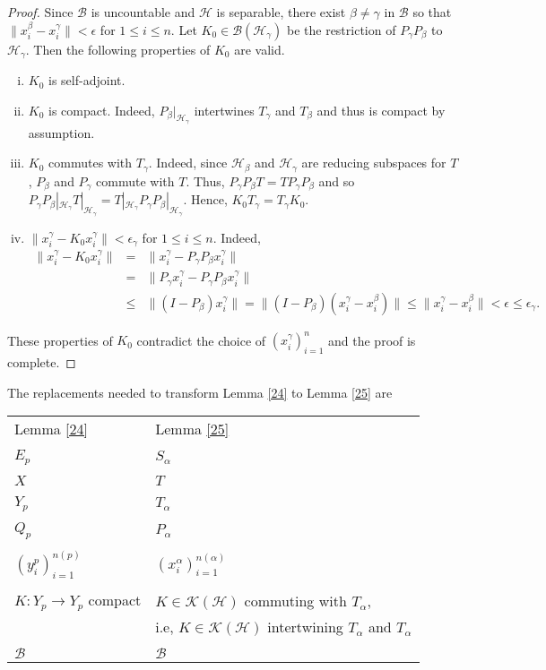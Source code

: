 \documentclass[11pt]{amsart}
\theoremstyle{definition}
\numberwithin{equation}{section}
\begin{document}
\begin{proof}
Since $\mathscr{B}$ is uncountable and $\mathcal{H}$ is separable, there exist $\beta\neq\gamma$ in $\mathscr{B}$ so that $\|x_{i}^{\beta}-x_{i}^{\gamma}\|<\epsilon$ for
$1\leq i\leq n$. Let $K_{0}\in\mathcal{B}(\mathcal{H}_{\gamma})$ be the restriction of $P_{\gamma}P_{\beta}$ to $\mathcal{H}_{\gamma}$. Then the following properties of
$K_{0}$ are valid.
\begin{enumerate}[(i)]
\item $K_{0}$ is self-adjoint.
\item $K_{0}$ is compact. Indeed, $P_{\beta}|_{\mathcal{H}_{\gamma}}$ intertwines $T_{\gamma}$ and $T_{\beta}$ and thus is compact by assumption.
\item $K_{0}$ commutes with $T_{\gamma}$. Indeed, since $\mathcal{H}_{\beta}$ and $\mathcal{H}_{\gamma}$ are reducing subspaces for $T$, $P_{\beta}$ and $P_{\gamma}$
commute with $T$. Thus, $P_{\gamma}P_{\beta}T=TP_{\gamma}P_{\beta}$ and so $P_{\gamma}P_{\beta}|_{\mathcal{H}_{\gamma}}T|_{\mathcal{H}_{\gamma}}=T|_{\mathcal{H}_{\gamma}}
P_{\gamma}P_{\beta}|_{\mathcal{H}_{\gamma}}$. Hence, $K_{0}T_{\gamma}=T_{\gamma}K_{0}$.
\item $\|x_{i}^{\gamma}-K_{0}x_{i}^{\gamma}\|<\epsilon_{\gamma}$ for $1\leq i\leq n$. Indeed,
\begin{eqnarray*}
\|x_{i}^{\gamma}-K_{0}x_{i}^{\gamma}\|&=&\|x_{i}^{\gamma}-P_{\gamma}P_{\beta}x_{i}^{\gamma}\|\\&=&\|P_{\gamma}x_{i}^{\gamma}-P_{\gamma}P_{\beta}x_{i}^{\gamma}\|\\&\leq&
\|(I-P_{\beta})x_{i}^{\gamma}\|=\|(I-P_{\beta})(x_{i}^{\gamma}-x_{i}^{\beta})\|\leq\|x_{i}^{\gamma}-x_{i}^{\beta}\|<\epsilon\leq\epsilon_{\gamma}.
\end{eqnarray*}
\end{enumerate}
These properties of $K_{0}$ contradict the choice of $(x_{i}^{\gamma})_{i=1}^{n}$ and the proof is complete.
\end{proof}
The replacements needed to transform Lemma \ref{24} to Lemma \ref{25} are
\begin{center}
\begin{tabular}{ll}
Lemma \ref{24}&Lemma \ref{25}\\\\
$E_{p}$&$S_{\alpha}$\\\\
$X$&$T$\\\\
$Y_{p}$&$T_{\alpha}$\\\\
$Q_{p}$&$P_{\alpha}$\\\\
$(y_{i}^{p})_{i=1}^{n(p)}$&$(x_{i}^{\alpha})_{i=1}^{n(\alpha)}$\\\\
$K:Y_{p}\to Y_{p}$ compact&$K\in\mathcal{K(H)}$ commuting with $T_{\alpha}$,\\&i.e, $K\in\mathcal{K(H)}$ intertwining $T_{\alpha}$ and $T_{\alpha}$\\\\
$\mathscr{B}$&$\mathscr{B}$
\end{tabular}
\end{center}
\end{document}
